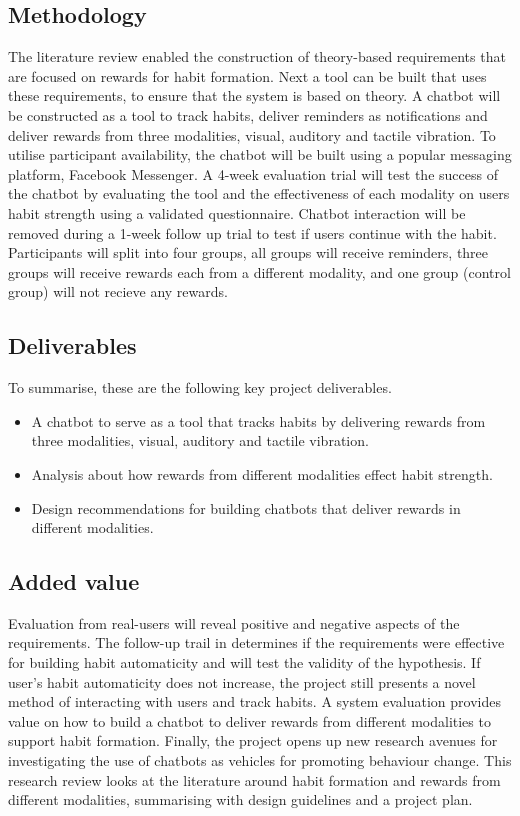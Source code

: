 \subsection*{Methodology}
The literature review enabled the construction of theory-based requirements that are focused on rewards for habit formation. Next a tool can be built that uses these requirements, to ensure that the system is based on theory. A chatbot will be constructed as a tool to track habits, deliver reminders as notifications and deliver rewards from three modalities, visual, auditory and tactile vibration. To utilise participant availability, the chatbot will be built using a popular messaging platform, Facebook Messenger.\newline
\newline
A 4-week evaluation trial will test the success of the chatbot by evaluating the tool and the effectiveness of each modality on users habit strength using a validated questionnaire. Chatbot interaction will be removed during a 1-week follow up trial to test if users continue with the habit. Participants will split into four groups, all groups will receive reminders, three groups will receive rewards each from a different modality, and one group (control group) will not recieve any rewards.

\newpage
\subsection*{Deliverables}
To summarise, these are the following key project deliverables.

\begin{itemize}
  \item A chatbot to serve as a tool that tracks habits by delivering rewards from three modalities, visual, auditory and tactile vibration.
  \item Analysis about how rewards from different modalities effect habit strength.
  \item Design recommendations for building chatbots that deliver rewards in different modalities.
\end{itemize}

\subsection*{Added value}
Evaluation from real-users will reveal positive and negative aspects of the requirements. The follow-up trail in determines if the requirements were effective for building habit automaticity and will test the validity of the hypothesis. If user's habit automaticity does not increase, the project still presents a novel method of interacting with users and track habits. A system evaluation provides value on how to build a chatbot to deliver rewards from different modalities to support habit formation. Finally, the project opens up new research avenues for investigating the use of chatbots as vehicles for promoting behaviour change.\newline
\newline
This research review looks at the literature around habit formation and rewards from different modalities, summarising with design guidelines and a project plan.

\newpage

